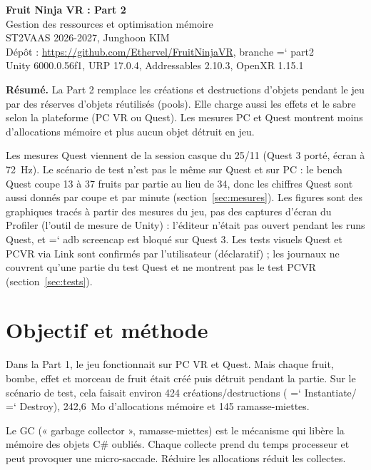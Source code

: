 \documentclass[11pt,a4paper]{article}
\renewcommand{\texttt}[1]{%
  {\ttfamily\hyphenchar\font=`\/ \hyphenpenalty=50 \exhyphenpenalty=50 #1}}
\begin{document}
\begin{center}
  {\LARGE\bfseries Fruit Ninja VR : Part 2}\\[4pt]
  {\Large Gestion des ressources et optimisation mémoire}\\[10pt]
  ST2VAAS 2026-2027, Junghoon KIM\\[4pt]
  Dépôt : \url{https://github.com/Ethervel/FruitNinjaVR}, branche \texttt{part2}\\[2pt]
  {\small Unity 6000.0.56f1, URP 17.0.4, Addressables 2.10.3, OpenXR 1.15.1}
\end{center}

\textbf{Résumé.} La Part 2 remplace les créations et destructions d'objets pendant le jeu
par des réserves d'objets réutilisés (pools). Elle charge aussi les effets et le sabre
selon la plateforme (PC VR ou Quest). Les mesures PC et Quest montrent moins d'allocations
mémoire et plus aucun objet détruit en jeu.

Les mesures Quest viennent de la session casque du 25/11 (Quest 3 porté, écran à
72~Hz). Le scénario de test n'est pas le même sur Quest et sur PC : le bench Quest
coupe 13 à 37 fruits par partie au lieu de 34, donc les chiffres Quest sont aussi
donnés par coupe et par minute (section~\ref{sec:mesures}). Les figures sont des
graphiques tracés à partir des mesures du jeu, pas des captures d'écran du Profiler
(l'outil de mesure de Unity) : l'éditeur n'était pas ouvert pendant les runs Quest,
et \texttt{adb screencap} est bloqué sur Quest 3. Les tests visuels Quest et PCVR
via Link sont confirmés par l'utilisateur (déclaratif) ; les journaux ne couvrent
qu'une partie du test Quest et ne montrent pas le test PCVR
(section~\ref{sec:tests}).

\section{Objectif et méthode}

Dans la Part 1, le jeu fonctionnait sur PC VR et Quest. Mais chaque fruit, bombe, effet
et morceau de fruit était créé puis détruit pendant la partie. Sur le scénario de test,
cela faisait environ 424 créations/destructions (\texttt{Instantiate}/\texttt{Destroy}),
242,6~Mo d'allocations mémoire et 145 ramasse-miettes.

Le GC (« garbage collector », ramasse-miettes) est le mécanisme qui libère la mémoire
des objets C\# oubliés. Chaque collecte prend du temps processeur et peut provoquer une
micro-saccade. Réduire les allocations réduit les collectes.
\end{document}
